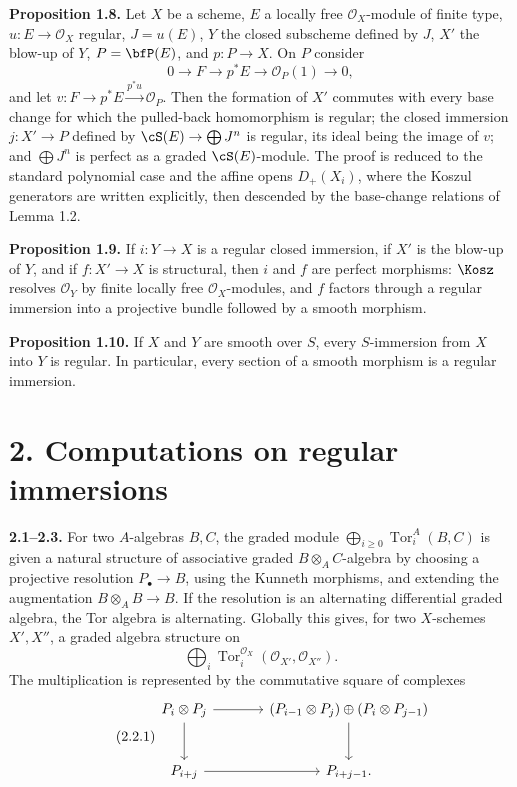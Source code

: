 \documentclass[11pt]{article}
\newcommand{\Tor}{\operatorname{Tor}}
\providecommand{\Tor}{\operatorname{Tor}}
\providecommand{\cO}{\mathcal O}
\begin{document}
\textbf{Proposition 1.8.} Let \(X\) be a scheme, \(E\) a locally free \(\cO_X\)-module of finite type, \(u:E\to\cO_X\) regular, \(J=u(E)\), \(Y\) the closed subscheme defined by \(J\), \(X'\) the blow-up of \(Y\), \(P=\bfP(E)\), and \(p:P\to X\). On \(P\) consider
\begin{equation}\tag{1.8.1}
0\to F\to p^*E\to\cO_P(1)\to0,
\end{equation}
and let \(v:F\to p^*E\xrightarrow{p^*u}\cO_P\). Then the formation of \(X'\) commutes with every base change for which the pulled-back homomorphism is regular; the closed immersion \(j:X'\to P\) defined by \(\cS(E)\to\bigoplus J^n\) is regular, its ideal being the image of \(v\); and \(\bigoplus J^n\) is perfect as a graded \(\cS(E)\)-module. The proof is reduced to the standard polynomial case and the affine opens \(D_+(X_i)\), where the Koszul generators are written explicitly, then descended by the base-change relations of Lemma 1.2.

\textbf{Proposition 1.9.} If \(i:Y\to X\) is a regular closed immersion, if \(X'\) is the blow-up of \(Y\), and if \(f:X'\to X\) is structural, then \(i\) and \(f\) are perfect morphisms: \(\Kosz\) resolves \(\cO_Y\) by finite locally free \(\cO_X\)-modules, and \(f\) factors through a regular immersion into a projective bundle followed by a smooth morphism.

\textbf{Proposition 1.10.} If \(X\) and \(Y\) are smooth over \(S\), every \(S\)-immersion from \(X\) into \(Y\) is regular. In particular, every section of a smooth morphism is a regular immersion.

\section*{2. Computations on regular immersions}

\textbf{2.1--2.3.} For two \(A\)-algebras \(B,C\), the graded module \(\bigoplus_{i\ge0}\Tor_i^A(B,C)\) is given a natural structure of associative graded \(B\otimes_A C\)-algebra by choosing a projective resolution \(P_\bullet\to B\), using the Kunneth morphisms, and extending the augmentation \(B\otimes_A B\to B\). If the resolution is an alternating differential graded algebra, the Tor algebra is alternating. Globally this gives, for two \(X\)-schemes \(X',X''\), a graded algebra structure on
\[
\bigoplus_i\Tor_i^{\cO_X}(\cO_{X'},\cO_{X''}).
\]
The multiplication is represented by the commutative square of complexes
\begin{equation}\tag{2.2.1}
\begin{tikzcd}[column sep=large,row sep=large]
P_i\otimes P_j \arrow[r] \arrow[d] & (P_{i-1}\otimes P_j)\oplus(P_i\otimes P_{j-1}) \arrow[d]\\
P_{i+j} \arrow[r] & P_{i+j-1}.
\end{tikzcd}
\end{equation}
\end{document}
